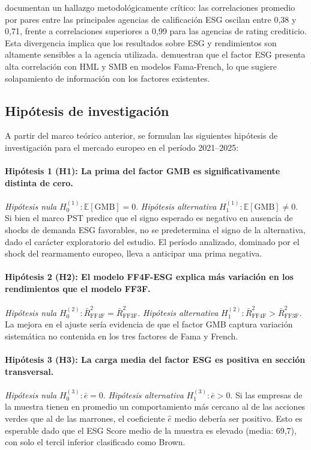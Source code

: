\documentclass[12pt, a4paper]{article}
\begin{document}
\textcite{bergkolbel2022} documentan un hallazgo metodol\'ogicamente cr\'itico:
las correlaciones promedio por pares entre las principales agencias de calificaci\'on
ESG oscilan entre 0,38 y 0,71, frente a correlaciones superiores a 0,99 para las
agencias de rating crediticio. Esta divergencia implica que los resultados sobre ESG y
rendimientos son altamente sensibles a la agencia utilizada. \textcite{lioui2022}
demuestran que el factor ESG presenta alta correlaci\'on con HML y SMB en modelos
Fama-French, lo que sugiere solapamiento de informaci\'on con los factores existentes.

\subsection{Hip\'otesis de investigaci\'on}
\label{subsec:hipotesis}

A partir del marco te\'orico anterior, se formulan las siguientes hip\'otesis de
investigaci\'on para el mercado europeo en el per\'iodo 2021--2025:

\paragraph{Hip\'otesis 1 (H1): La prima del factor GMB es significativamente distinta
de cero.}
\textit{Hip\'otesis nula} $H_0^{(1)}\colon\mathbb{E}[\mathrm{GMB}] = 0$.
\textit{Hip\'otesis alternativa} $H_1^{(1)}\colon\mathbb{E}[\mathrm{GMB}] \neq 0$.
Si bien el marco PST predice que el signo esperado es negativo en ausencia de shocks
de demanda ESG favorables, no se predetermina el signo de la alternativa, dado el
car\'acter exploratorio del estudio. El per\'iodo analizado, dominado por el shock
del rearmamento europeo, lleva a anticipar una prima negativa.

\paragraph{Hip\'otesis 2 (H2): El modelo FF4F-ESG explica m\'as variaci\'on en los
rendimientos que el modelo FF3F.}
\textit{Hip\'otesis nula} $H_0^{(2)}\colon\bar{R}^2_{\mathrm{FF4F}} = \bar{R}^2_{\mathrm{FF3F}}$.
\textit{Hip\'otesis alternativa} $H_1^{(2)}\colon\bar{R}^2_{\mathrm{FF4F}} >
\bar{R}^2_{\mathrm{FF3F}}$.
La mejora en el ajuste ser\'ia evidencia de que el factor GMB captura variaci\'on
sistem\'atica no contenida en los tres factores de Fama y French.

\paragraph{Hip\'otesis 3 (H3): La carga media del factor ESG es positiva en secci\'on
transversal.}
\textit{Hip\'otesis nula} $H_0^{(3)}\colon\bar{e} = 0$.
\textit{Hip\'otesis alternativa} $H_1^{(3)}\colon\bar{e} > 0$.
Si las empresas de la muestra tienen en promedio un comportamiento m\'as cercano al
de las acciones verdes que al de las marrones, el coeficiente $\hat{e}$ medio
deber\'ia ser positivo. Esto es esperable dado que el ESG Score medio de la muestra
es elevado (media: 69,7), con solo el tercil inferior clasificado como Brown.
\end{document}
